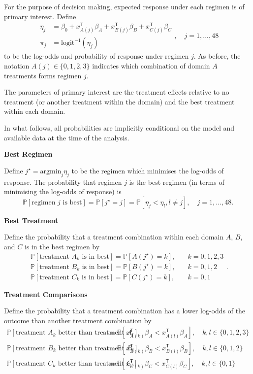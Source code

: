 \documentclass[
]{article}
\begin{document}
For the purpose of decision making, expected response under each regimen is of primary interest.
Define
\[
\begin{aligned}
\eta_j &= \beta_0 + x_{A(j)}^{\mathsf{T}}\beta_A + x_{B(j)}^{\mathsf{T}}\beta_B + x_{C(j)}^{\mathsf{T}}\beta_C \\
\pi_j &= \text{logit}^{-1}(\eta_j)
\end{aligned},\quad j=1,...,48
\]
to be the log-odds and probability of response under regimen \(j\).
As before, the notation \(A(j)\in\{0,1,2,3\}\) indicates which combination of domain \(A\) treatments forms regimen \(j\).

The parameters of primary interest are the treatment effects relative to no treatment (or another treatment within the domain) and the best treatment within each domain.

In what follows, all probabilities are implicitly conditional on the model and available data at the time of the analysis.

\textbf{Best Regimen}

Define \(j^\star = \text{argmin}_j \eta_j\) to be the regimen which minimises the log-odds of response.
The probability that regimen \(j\) is the best regimen (in terms of minimising the log-odds of response) is
\[
\mathbb P[\text{regimen }j\text{ is best}] = \mathbb P[j^\star = j] = \mathbb P[\eta_j < \eta_{l}, l\ne j],\quad j=1,...,48.
\]

\textbf{Best Treatment}

Define the probability that a treatment combination within each domain \(A\), \(B\), and \(C\) is in the best regimen by
\[
\begin{aligned}
\mathbb P[\text{treatment }A_k\text{ is in best}] = \mathbb P[A(j^\star)=k],&\quad k=0,1,2,3 \\
\mathbb P[\text{treatment }B_k\text{ is in best}] = \mathbb P[B(j^\star)=k],&\quad k=0,1,2 \\
\mathbb P[\text{treatment }C_k\text{ is in best}] = \mathbb P[C(j^\star)=k],&\quad k=0,1
\end{aligned}.
\]

\textbf{Treatment Comparisons}

Define the probability that a treatment combination has a lower log-odds of the outcome than another treatment combination by
\[
\begin{aligned}
\mathbb P[\text{treatment }A_k\text{ better than treatment } A_l] &=\mathbb P\left[x_{A(k)}^{\mathsf{T}}\beta_A < x_{A(l)}^{\mathsf{T}}\beta_A\right],\quad k,l\in\{0,1,2,3\} \\
\mathbb P[\text{treatment }B_k\text{ better than treatment } B_l] &=\mathbb P\left[x_{B(k)}^{\mathsf{T}}\beta_B < x_{B(l)}^{\mathsf{T}}\beta_B\right],\quad k,l\in\{0,1,2\} \\
\mathbb P[\text{treatment }C_k\text{ better than treatment } C_l] &=\mathbb P\left[x_{C(k)}^{\mathsf{T}}\beta_C < x_{C(l)}^{\mathsf{T}}\beta_C\right],\quad k,l\in\{0,1\}
\end{aligned}
\]
\end{document}
